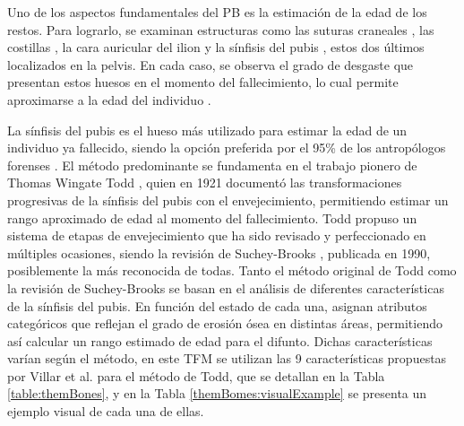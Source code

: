Uno de los aspectos fundamentales del PB es la estimación de la edad de los restos. Para lograrlo, se examinan estructuras como las suturas craneales \cite{skullAF}, las costillas \cite{icscan1984age}, la cara auricular del ilion \cite{buckberry_age_2002} y la sínfisis del pubis \cite{garvin_current_2012}, estos dos últimos localizados en la pelvis. En cada caso, se observa el grado de desgaste que presentan estos huesos en el momento del fallecimiento, lo cual permite aproximarse a la edad del individuo \cite{RefWorks:RefID:12-black2011forensic}.

La sínfisis del pubis es el hueso más utilizado para estimar la edad de un individuo ya fallecido, siendo la opción preferida por el 95\% de los antropólogos forenses \cite{garvin_current_2012}. El método predominante se fundamenta en el trabajo pionero de Thomas Wingate Todd \cite{RefWorks:RefID:19-todd1921age}, quien en 1921 documentó las transformaciones progresivas de la sínfisis del pubis con el envejecimiento, permitiendo estimar un rango aproximado de edad al momento del fallecimiento. Todd propuso un sistema de etapas de envejecimiento que ha sido revisado y perfeccionado en múltiples ocasiones, siendo la revisión de Suchey-Brooks \cite{RefWorks:RefID:20-brooks1990skeletal}, publicada en 1990, posiblemente la más reconocida de todas. Tanto el método original de Todd como la revisión de Suchey-Brooks se basan en el análisis de diferentes características de la sínfisis del pubis. En función del estado de cada una, asignan atributos categóricos que reflejan el grado de erosión ósea en distintas áreas, permitiendo así calcular un rango estimado de edad para el difunto. Dichas características varían según el método, en este TFM se utilizan las 9 características propuestas por Villar et al. \cite{villar2017first} para el método de Todd, que se detallan en la Tabla \ref{table:themBones}, y en la Tabla \ref{themBomes:visualExample} se presenta un ejemplo visual de cada una de ellas.

